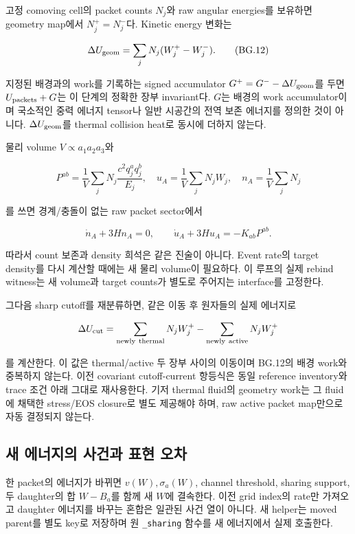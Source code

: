 \documentclass[11pt,a4paper]{article}
\begin{document}
고정 comoving cell의 packet counts \(N_j\)와 raw angular energies를 보유하면 geometry map에서 \(N_j^+=N_j^-\)다. Kinetic energy 변화는

\[\Delta U_{\rm geom}=\sum_jN_j(W_j^+-W_j^-).\tag{BG.12}\]

지정된 배경과의 work를 기록하는 signed accumulator \(G^+=G^- -\Delta U_{\rm geom}\)를 두면 \(U_{\rm packets}+G\)는 이 단계의 정확한 장부 invariant다. \(G\)는 배경의 work accumulator이며 국소적인 중력 에너지 tensor나 일반 시공간의 전역 보존 에너지를 정의한 것이 아니다. \(\Delta U_{\rm geom}\)를 thermal collision heat로 동시에 더하지 않는다.

물리 volume \(V\propto a_1a_2a_3\)와

\[P^{ab}=\frac1V\sum_jN_j\frac{c^2q_j^aq_j^b}{E_j},\quad u_A=\frac1V\sum_jN_jW_j,\quad n_A=\frac1V\sum_jN_j\tag{BG.13}\]

를 쓰면 경계/충돌이 없는 raw packet sector에서

\[\dot n_A+3Hn_A=0,\qquad\dot u_A+3Hu_A=-K_{ab}P^{ab}.\tag{BG.14}\]

따라서 count 보존과 density 희석은 같은 진술이 아니다. Event rate의 target density를 다시 계산할 때에는 새 물리 volume이 필요하다. 이 루프의 실제 rebind witness는 새 volume과 target counts가 별도로 주어지는 interface를 고정한다.

그다음 sharp cutoff를 재분류하면, 같은 이동 후 원자들의 실제 에너지로

\[\Delta U_{\rm cut}=\sum_{\rm newly\ thermal}N_jW_j^+-\sum_{\rm newly\ active}N_jW_j^+\]

를 계산한다. 이 값은 thermal/active 두 장부 사이의 이동이며 BG.12의 배경 work와 중복하지 않는다. 이전 covariant cutoff-current 항등식은 동일 reference inventory와 trace 조건 아래 그대로 재사용한다. 기저 thermal fluid의 geometry work는 그 fluid에 채택한 stress/EOS closure로 별도 제공해야 하며, raw active packet map만으로 자동 결정되지 않는다.

\hypertarget{uxc0c8-uxc5d0uxb108uxc9c0uxc758-uxc0acuxac74uxacfc-uxd45cuxd604-uxc624uxcc28}{%
\subsection{새 에너지의 사건과 표현 오차}\label{uxc0c8-uxc5d0uxb108uxc9c0uxc758-uxc0acuxac74uxacfc-uxd45cuxd604-uxc624uxcc28}}

한 packet의 에너지가 바뀌면 \(v(W),\sigma_a(W)\), channel threshold, sharing support, 두 daughter의 합 \(W-B_a\)를 함께 새 \(W\)에 결속한다. 이전 grid index의 rate만 가져오고 daughter 에너지를 바꾸는 혼합은 일관된 사건 열이 아니다. 새 helper는 moved parent를 별도 key로 저장하며 원 \texttt{\_sharing} 함수를 새 에너지에서 실제 호출한다.
\end{document}
